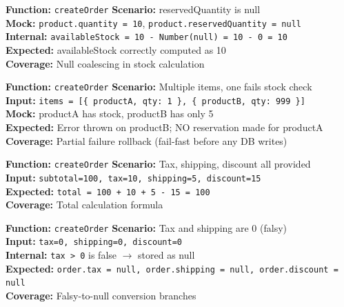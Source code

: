 \documentclass[12pt,a4paper]{report}
\newcommand{\ptwo}{\textbf{\color{p2orange}P2}}
\newcommand{\pthree}{\textbf{\color{p3blue}P3}}
\begin{document}
\begin{tcolorbox}[testbox,title={ORD-007 \hfill \pthree}]
\textbf{Function:} \texttt{createOrder} \quad \textbf{Scenario:} reservedQuantity is null \\
\textbf{Mock:} \texttt{product.quantity = 10}, \texttt{product.reservedQuantity = null} \\
\textbf{Internal:} \texttt{availableStock = 10 - Number(null) = 10 - 0 = 10} \\
\textbf{Expected:} availableStock correctly computed as 10 \\
\textbf{Coverage:} Null coalescing in stock calculation
\end{tcolorbox}

\begin{tcolorbox}[criticalbox,title={ORD-008 \hfill \ptwo\ --- Atomicity}]
\textbf{Function:} \texttt{createOrder} \quad \textbf{Scenario:} Multiple items, one fails stock check \\
\textbf{Input:} \texttt{items = [\{ productA, qty: 1 \}, \{ productB, qty: 999 \}]} \\
\textbf{Mock:} productA has stock, productB has only 5 \\
\textbf{Expected:} Error thrown on productB; NO reservation made for productA \\
\textbf{Coverage:} Partial failure rollback (fail-fast before any DB writes)
\end{tcolorbox}

\begin{tcolorbox}[testbox,title={ORD-009 \hfill \ptwo}]
\textbf{Function:} \texttt{createOrder} \quad \textbf{Scenario:} Tax, shipping, discount all provided \\
\textbf{Input:} \texttt{subtotal=100, tax=10, shipping=5, discount=15} \\
\textbf{Expected:} \texttt{total = 100 + 10 + 5 - 15 = 100} \\
\textbf{Coverage:} Total calculation formula
\end{tcolorbox}

\begin{tcolorbox}[testbox,title={ORD-010 \hfill \pthree}]
\textbf{Function:} \texttt{createOrder} \quad \textbf{Scenario:} Tax and shipping are 0 (falsy) \\
\textbf{Input:} \texttt{tax=0, shipping=0, discount=0} \\
\textbf{Internal:} \texttt{tax > 0} is false $\to$ stored as null \\
\textbf{Expected:} \texttt{order.tax = null, order.shipping = null, order.discount = null} \\
\textbf{Coverage:} Falsy-to-null conversion branches
\end{tcolorbox}
\end{document}
